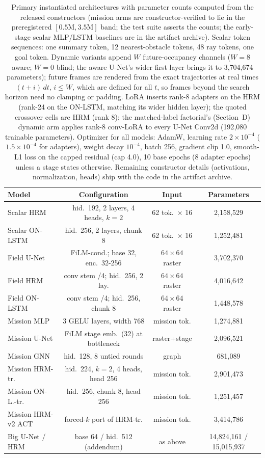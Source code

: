 \documentclass[letterpaper]{article} %
\begin{document}
\begin{table}[t]
\centering
\small
\setlength{\tabcolsep}{1.6pt}
\begin{tabular}{@{}lccc@{}}
\toprule
Model & Configuration & Input & Parameters \\
\midrule
Scalar HRM & hid.\ 192, 2 layers, 4 heads, $k{=}2$ & 62 tok.\ $\times$ 16 & 2{,}158{,}529 \\
Scalar ON-LSTM & hid.\ 256, 2 layers, chunk 8 & 62 tok.\ $\times$ 16 & 1{,}252{,}481 \\
Field U-Net & FiLM-cond.; base 32, enc.\ 32-256 & $64{\times}64$ raster & 3{,}702{,}370 \\
Field HRM & conv stem /4; hid.\ 256, 2 lay. & $64{\times}64$ raster & 4{,}016{,}642 \\
Field ON-LSTM & conv stem /4; hid.\ 256, chunk 8 & $64{\times}64$ raster & 1{,}448{,}578 \\
\midrule
Mission MLP & 3 GELU layers, width 768 & mission tok. & 1{,}274{,}881 \\
Mission U-Net & FiLM stage emb.\ (32) at bottleneck & raster+stage & 2{,}096{,}521 \\
Mission GNN & hid.\ 128, 8 untied rounds & graph & 681{,}089 \\
Mission HRM-tr. & hid.\ 224, $k{=}2$, 4 heads, head 256 & mission tok. & 2{,}901{,}473 \\
Mission ON-L.-tr. & hid.\ 256, chunk 8, head 256 & mission tok. & 1{,}251{,}457 \\
Mission HRM-v2 ACT & forced-$k$ port of HRM-tr. & mission tok. & 3{,}414{,}786 \\
Big U-Net / HRM & base 64 / hid.\ 512 (addendum) & as above & 14{,}824{,}161 / 15{,}015{,}937 \\
\bottomrule
\end{tabular}
\caption{Primary instantiated architectures with parameter counts computed from the released constructors (mission arms are constructor-verified to lie in the preregistered $[0.5\mathrm{M}, 3.5\mathrm{M}]$ band; the test suite asserts the counts; the early-stage scalar MLP/LSTM baselines are in the artifact archive). Scalar token sequences: one summary token, 12 nearest-obstacle tokens, 48 ray tokens, one goal token. Dynamic variants append $W$ future-occupancy channels ($W{=}8$ aware; $W{=}0$ blind; the aware U-Net's wider first layer brings it to 3{,}704{,}674 parameters); future frames are rendered from the exact trajectories at real times $(t{+}i)\,dt$, $i \le W$, which are defined for all $t$, so frames beyond the search horizon need no clamping or padding. LoRA \citep{hu2021lora} inserts rank-8 adapters on the HRM (rank-24 on the ON-LSTM, matching its wider hidden layer); the quoted crossover cells are HRM (rank 8); the matched-label factorial's (Section~D) dynamic arm applies rank-8 conv-LoRA to every U-Net Conv2d (192{,}080 trainable parameters). Optimizer for all models: AdamW, learning rate $2{\times}10^{-4}$ ($1.5{\times}10^{-4}$ for adapters), weight decay $10^{-4}$, batch 256, gradient clip 1.0, smooth-L1 loss on the capped residual (cap 4.0), 10 base epochs (8 adapter epochs) unless a stage states otherwise. Remaining constructor details (activations, normalization, heads) ship with the code in the artifact archive.}

\end{table}
\end{document}
